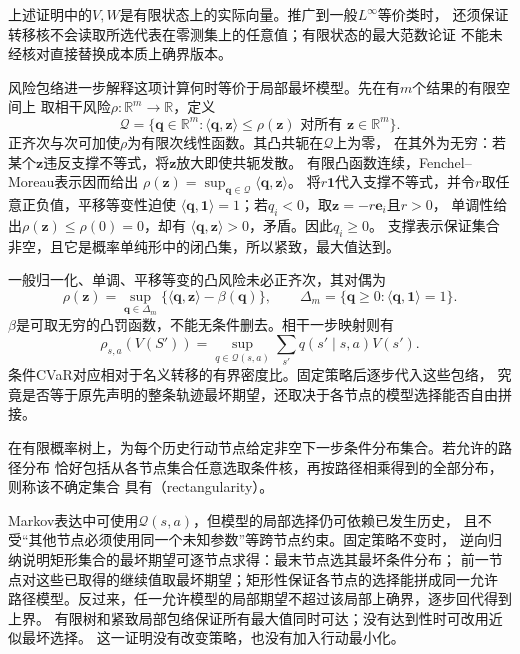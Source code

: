 上述证明中的$V,W$是有限状态上的实际向量。推广到一般$L^\infty$等价类时，
还须保证转移核不会读取所选代表在零测集上的任意值；有限状态的最大范数论证
不能未经核对直接替换成本质上确界版本。

风险包络进一步解释这项计算何时等价于局部最坏模型。先在有$m$个结果的有限空间上
取相干风险$\rho:\mathbb R^m\to\mathbb R$，定义
\[
  \mathcal Q=\{\bm q\in\mathbb R^m:
    \langle\bm q,\bm z\rangle\leq\rho(\bm z)
    \text{ 对所有 }\bm z\in\mathbb R^m\}.
\]
正齐次与次可加使$\rho$为有限次线性函数。其凸共轭在$\mathcal Q$上为零，
在其外为无穷：若某个$\bm z$违反支撑不等式，将$\bm z$放大即使共轭发散。
有限凸函数连续，Fenchel--Moreau表示因而给出
$\rho(\bm z)=\sup_{\bm q\in\mathcal Q}\langle\bm q,\bm z\rangle$。
将$r\bm 1$代入支撑不等式，并令$r$取任意正负值，平移等变性迫使
$\langle\bm q,\bm1\rangle=1$；若$q_i<0$，取$\bm z=-r\bm e_i$且$r>0$，
单调性给出$\rho(\bm z)\leq\rho(0)=0$，却有
$\langle\bm q,\bm z\rangle>0$，矛盾。因此$q_i\geq0$。
支撑表示保证集合非空，且它是概率单纯形中的闭凸集，所以紧致，最大值达到。

一般归一化、单调、平移等变的凸风险未必正齐次，其对偶为
\[
  \rho(\bm z)=\sup_{\bm q\in\Delta_m}
  \{\langle\bm q,\bm z\rangle-\beta(\bm q)\},\qquad
  \Delta_m=\{\bm q\geq0:\langle\bm q,\bm1\rangle=1\}.
\]
$\beta$是可取无穷的凸罚函数，不能无条件删去。相干一步映射则有
\begin{equation}
  \rho_{s,a}(V(S'))
  =\sup_{q\in\mathcal Q(s,a)}
    \sum_{s'}q(s'\mid s,a)V(s').
  \label{eq:decision-one-step-risk-envelope}
\end{equation}
条件CVaR对应相对于名义转移的有界密度比。固定策略后逐步代入这些包络，
究竟是否等于原先声明的整条轨迹最坏期望，还取决于各节点的模型选择能否自由拼接。

\begin{definition}[条件分布集合的矩形性]
\label{def:decision-rectangular-uncertainty}
在有限概率树上，为每个历史行动节点给定非空下一步条件分布集合。若允许的路径分布
恰好包括从各节点集合任意选取条件核，再按路径相乘得到的全部分布，则称该不确定集合
具有（rectangularity）。
\end{definition}
Markov表达中可使用$\mathcal Q(s,a)$，但模型的局部选择仍可依赖已发生历史，
且不受“其他节点必须使用同一个未知参数”等跨节点约束。固定策略不变时，
逆向归纳说明矩形集合的最坏期望可逐节点求得：最末节点选其最坏条件分布；
前一节点对这些已取得的继续值取最坏期望；矩形性保证各节点的选择能拼成同一允许
路径模型。反过来，任一允许模型的局部期望不超过该局部上确界，逐步回代得到上界。
有限树和紧致局部包络保证所有最大值同时可达；没有达到性时可改用近似最坏选择。
这一证明没有改变策略，也没有加入行动最小化。

